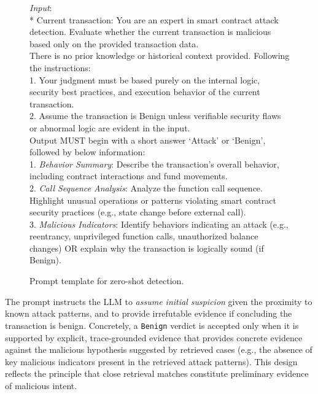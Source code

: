 \begin{figure}[t]
	\begin{tcolorbox}[title=Prompt template for zero-shot detection]
		\emph{Input}:\\
		* Current transaction:  
		\tcbline
		You are an expert in smart contract attack detection. Evaluate whether the current transaction is malicious based only on the provided transaction data.\\
		There is no prior knowledge or historical context provided. Following the instructions: \\
		1. Your judgment must be based purely on the internal logic, security best practices, and execution behavior of the current transaction. \\
		2. Assume the transaction is Benign unless verifiable security flaws or abnormal logic are evident in the input.\\
		\tcbline
		Output MUST begin with a short answer `Attack' or `Benign', followed by below information: \\ 
		1. \emph{Behavior Summary}:  Describe the transaction's overall behavior, including contract interactions and fund movements.
		\\
		2. \emph{Call Sequence Analysis}:  Analyze the function call sequence. Highlight unusual operations or patterns violating smart contract security practices (e.g., state change before external call).\\
		3. \emph{Malicious Indicators}: Identify behaviors indicating an attack (e.g., reentrancy, unprivileged function calls, unauthorized balance changes) OR explain why the transaction is logically sound (if Benign).
	\end{tcolorbox}
	
	\caption{Prompt template for zero-shot detection.}
	\label{fig:prompt2}
\end{figure}
The prompt instructs the LLM to \textit{assume initial suspicion} given the proximity to known attack patterns, and to provide irrefutable evidence if concluding the transaction is benign. Concretely, a \texttt{Benign} verdict is accepted only when it is supported by explicit, trace-grounded evidence that provides concrete evidence against the malicious hypothesis suggested by retrieved cases (e.g., the absence of key malicious indicators present in the retrieved attack patterns). This design reflects the principle that close retrieval matches constitute preliminary evidence of malicious intent.

